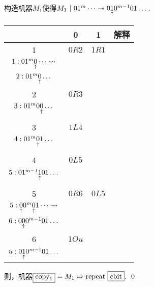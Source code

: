 \begin{pf}
    构造机器$M_1$使得$M_1\ | \  01^{m}\dots \twoheadrightarrow 0\underset{\substack{\uparrow}}{1}0^{m-1}01\dots$. 
    \begin{center}
        \footnotesize
        \begin{tabular}{ |c|c|c|c| } 
        \hline
          & 0 & 1 & 解释 \\ 
        \hline
        1 & $0R2$ & $1R1$ & \makecell{
            $1:0\pointer{1}^{m}\dots\leadsto$\\
            $1:01^m \underset{\substack{\uparrow}}{0} \dots\leadsto$\\
            $2: 01^{m} \underset{\substack{\uparrow}}{0} \dots $} 
        \\  \hline %
        2 & $0R3$ &  & \makecell{ 
            $2: 01^{m} \pointer{0} \dots\leadsto$\\
            $3: 01^{m} 0 \underset{\substack{\uparrow}}{0} \dots$\\
        }
        \\  \hline
        3 & $1L4$ &  & \makecell{ 
            $3: 01^{m} 0 \pointer{0} \dots\leadsto$\\
            $4: 01^{m} \underset{\substack{\uparrow}}{0} 1 \dots$\\
        }
        \\  \hline
        4 & $0L5$ &  & \makecell{ 
            $4: 01^{m} \pointer{0} 1 \dots\leadsto$\\
            $5: 01^{m-1} \underset{\substack{\uparrow}}{1} 0 1 \dots$\\
        }
        \\  \hline
        5 & $0R6$ & $0L5$ & \makecell{ 
            $5: 01^{m-1} \pointer{1} 0 1 \dots\leadsto$\\
            $5: \underset{\substack{\uparrow}}{0}0^{m} \underset{\substack{\uparrow}}{0} 1 \dots\leadsto$\\
            $6: 0\underset{\substack{\uparrow}}{0}0^{m-1}01\dots$
        }
        \\  \hline
        6 & $1Ou$ & & \makecell{ 
            $6: 0\pointer{0}0^{m-1}01\dots\leadsto$\\
            $u: 0\underset{\substack{\uparrow}}{1}0^{m-1}01\dots$
        }
        \\  \hline
            \end{tabular}
        \end{center}
        则，机器$\boxed{\textrm{copy}_1} = M_1 \Mapsto \mathrm{repeat}\ \boxed{\mathrm{cbit}} $.
    \qed
\end{pf}
